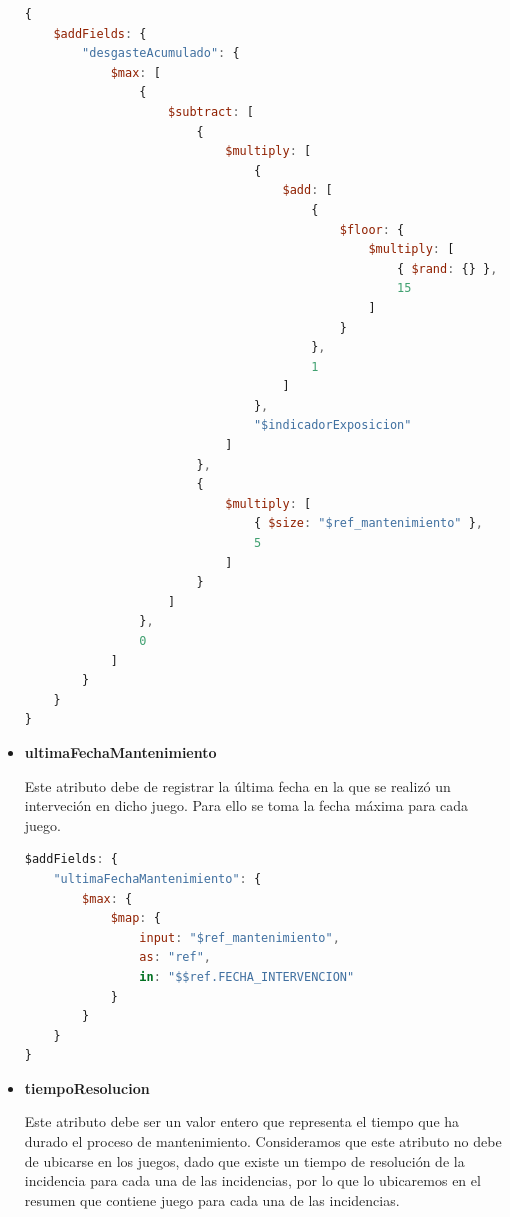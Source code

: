 \documentclass[]{article}
\begin{document}
\begin{itemize}
    \begin{lstlisting}[caption=Cálculo de desgasteAcumulado, language=JavaScript]
{
    $addFields: {
        "desgasteAcumulado": {
            $max: [
                {
                    $subtract: [
                        {
                            $multiply: [
                                {
                                    $add: [
                                        {
                                            $floor: {
                                                $multiply: [
                                                    { $rand: {} },
                                                    15
                                                ]
                                            }
                                        },
                                        1
                                    ]
                                },
                                "$indicadorExposicion"
                            ]
                        },
                        {
                            $multiply: [
                                { $size: "$ref_mantenimiento" },
                                5
                            ]
                        }
                    ]
                },
                0
            ]
        }
    }
}
    \end{lstlisting}

    \item \textbf{ultimaFechaMantenimiento}
    
    Este atributo debe de registrar la última fecha en la que se realizó un interveción en dicho juego. Para ello se toma la fecha máxima para cada juego.

    \begin{lstlisting}[caption=Cálculo de ultimaFechaMantenimiento, language=JavaScript]
$addFields: {
    "ultimaFechaMantenimiento": {
        $max: {
            $map: {
                input: "$ref_mantenimiento",
                as: "ref",
                in: "$$ref.FECHA_INTERVENCION"
            }
        }
    }
}
    \end{lstlisting}

    \item \textbf{tiempoResolucion}
    
    Este atributo debe ser un valor entero que representa el tiempo que ha durado el proceso de mantenimiento. Consideramos que este atributo no debe de ubicarse en los juegos, dado que existe un tiempo de resolución de la incidencia para cada una de las incidencias, por lo que lo ubicaremos en el resumen que contiene juego para cada una de las incidencias.


\end{itemize}
\end{document}
